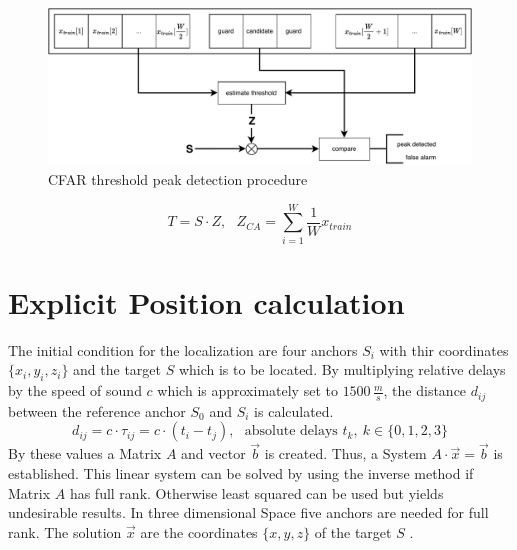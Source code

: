 %
\begin{figure}[h]
	\includegraphics[width=\linewidth]{images/peakdet}
	
	\caption{CFAR threshold peak detection procedure \cite{rohling11}}
	\label{fig:simsig}
\end{figure}

\begin{equation}
	T=S\cdot Z,~~~Z_{CA}=\sum_{i=1}^{W}\dfrac{1}{W}x_{train}
	\label{eq:cff}
\end{equation}


\section{Explicit Position calculation}

The initial condition for the localization are four anchors $S_i$ with thir coordinates $\{x_i,y_i,z_i\}$ and the target $S$ which is to be located. By multiplying relative delays by the speed of sound $c$ which is approximately set to $1500\,\frac{m}{s}$, the distance $d_{ij}$ between the reference anchor $S_0$ and $S_i$ is calculated.\\
\begin{equation}
	d_{ij}=c\cdot\tau_{ij}=c\cdot (t_i-t_j),~~~\text{absolute delays } t_k,~k\in \{0,1,2,3\}
\end{equation}
By these values a Matrix $A$ and vector $\vec{b}$ is created. Thus, a System $A\cdot \vec{x}=\vec{b}$ is established. This linear system can be solved by using the inverse method if Matrix $A$ has full rank. Otherwise least squared can be used but yields undesirable results. In three dimensional Space five anchors are needed for full rank. The solution $\vec{x}$ are the coordinates $\{x,y,z\}$ of the target $S$ \cite{yang11}.

